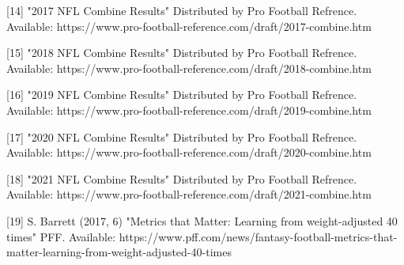 \documentclass[confrence]{IEEEtran}
\begin{document}
[14] "2017 NFL Combine Results" Distributed by Pro Football Refrence. Available: https://www.pro-football-reference.com/draft/2017-combine.htm

[15] "2018 NFL Combine Results" Distributed by Pro Football Refrence. Available: https://www.pro-football-reference.com/draft/2018-combine.htm

[16] "2019 NFL Combine Results" Distributed by Pro Football Refrence. Available: https://www.pro-football-reference.com/draft/2019-combine.htm

[17] "2020 NFL Combine Results" Distributed by Pro Football Refrence. Available: https://www.pro-football-reference.com/draft/2020-combine.htm

[18] "2021 NFL Combine Results" Distributed by Pro Football Refrence. Available: https://www.pro-football-reference.com/draft/2021-combine.htm

[19] S. Barrett (2017, 6) "Metrics that Matter: Learning from weight-adjusted 40 times" PFF. Available: https://www.pff.com/news/fantasy-football-metrics-that-matter-learning-from-weight-adjusted-40-times
\end{document}
